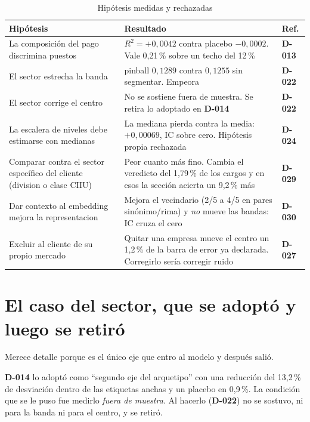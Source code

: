 \documentclass[12pt,a4paper]{report}
\newcommand{\dref}[1]{\textbf{D-#1}}
\begin{document}
\begin{table}[h]
\centering
\caption{Hipótesis medidas y rechazadas}
\label{tab:negativos}
\small
\begin{tabular}{p{4.2cm}p{6.5cm}l}
\toprule
Hipótesis & Resultado & Ref. \\
\midrule
La composición del pago discrimina puestos &
$R^2 = +0{,}0042$ contra placebo $-0{,}0002$. Vale 0,21\,\% sobre un techo del 12\,\% &
\dref{013} \\[0.8ex]

El sector estrecha la banda &
pinball $0{,}1289$ contra $0{,}1255$ sin segmentar. Empeora &
\dref{022} \\[0.8ex]

El sector corrige el centro &
No se sostiene fuera de muestra. Se retira lo adoptado en \dref{014} &
\dref{022} \\[0.8ex]

La escalera de niveles debe estimarse con medianas &
La mediana pierda contra la media: $+0{,}00069$, IC sobre cero. Hipótesis propia rechazada &
\dref{024} \\[0.8ex]

Comparar contra el sector específico del cliente (division o clase CIIU) &
Peor cuanto más fino. Cambia el veredicto del 1,79\,\% de los cargos y en esos la sección acierta un 9,2\,\% más &
\dref{029} \\[0.8ex]

Dar contexto al embedding mejora la representacion &
Mejora el vecindario (2/5 a 4/5 en pares sinónimo/rima) y \emph{no} mueve las bandas: IC cruza el cero &
\dref{030} \\[0.8ex]

Excluir al cliente de su propio mercado &
Quitar una empresa mueve el centro un 1,2\,\% de la barra de error ya declarada. Corregirlo sería corregir ruido &
\dref{027} \\
\bottomrule
\end{tabular}
\end{table}

\section{El caso del sector, que se adoptó y luego se retiró}

Merece detalle porque es el único eje que entro al modelo y después salió.

\dref{014} lo adoptó como ``segundo eje del arquetipo'' con una reducción del
13,2\,\% de desviación dentro de las etiquetas anchas y un placebo en 0,9\,\%. La
condición que se le puso fue medirlo \emph{fuera de muestra}. Al hacerlo
(\dref{022}) no se sostuvo, ni para la banda ni para el centro, y se retiró.
\end{document}
